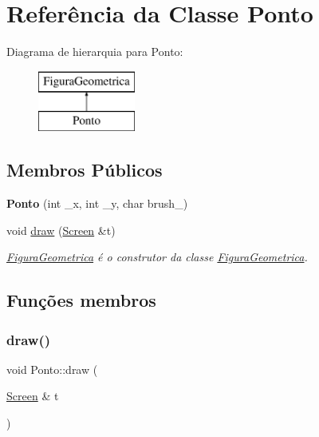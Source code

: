 \hypertarget{class_ponto}{}\section{Referência da Classe Ponto}
\label{class_ponto}
Diagrama de hierarquia para Ponto\+:\begin{figure}[H]
\begin{center}
\leavevmode
\includegraphics[height=2.000000cm]{class_ponto}
\end{center}
\end{figure}
\subsection*{Membros Públicos}
\begin{DoxyCompactItemize}
\item 
\mbox{\label{class_ponto_a12ce1ad29a82da82ceb4c7d638bc46b9}} 
{\bfseries Ponto} (int \+\_\+x, int \+\_\+y, char brush\+\_\+)
\item 
void \mbox{\hyperlink{class_ponto_acc49c2522288aea2819458f245bbc9df}{draw}} (\mbox{\hyperlink{class_screen}{Screen}} \&t)
\begin{DoxyCompactList}\small\item\em \mbox{\hyperlink{class_figura_geometrica}{Figura\+Geometrica}} é o construtor da classe \mbox{\hyperlink{class_figura_geometrica}{Figura\+Geometrica}}. \end{DoxyCompactList}\end{DoxyCompactItemize}


\subsection{Funções membros}
\mbox{\label{class_ponto_acc49c2522288aea2819458f245bbc9df}} 
\subsubsection{\texorpdfstring{draw()}{draw()}}
{\footnotesize\ttfamily void Ponto\+::draw (\begin{DoxyParamCaption}\item[{\mbox{\hyperlink{class_screen}{Screen}} \&}]{t }\end{DoxyParamCaption})\hspace{0.3cm}{\ttfamily [virtual]}}



